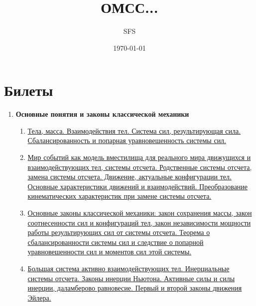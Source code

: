 \documentclass[a4paper,12pt]{article}
\title{ОМСС...}
\author{SFS}
\date{\today}
\begin{document}
\maketitle
\section*{Билеты}
\begin{enumerate}
\item \textbf{ Основные понятия и законы классической механики}

\begin{enumerate}
\item \hyperlink{bil1_1}{Тела, масса. Взаимодействия тел. Система сил, результирующая сила. Сбалансированность и попарная уравновешенность системы сил.}
\item \hyperlink{bil1_2}{Мир событий как модель вместилища для реального мира движущихся и взаимодействующих тел, системы отсчета. Родственные системы отсчета, замена системы отсчета. Движение, актуальные конфигурации тел. Основные характеристики движений и взаимодействий. Преобразование кинематических характеристик при замене системы отсчета.}
\item \hyperlink{bil1_3}{Основные законы классической механики: закон сохранения массы, закон соотнесенности сил и конфигураций тел, закон независимости мощности работы результирующих сил от системы отсчета. Теорема о сбалансированности системы сил и следствие о попарной уравновешенности сил и моментов сил этой системы.}
\item \hyperlink{bil1_4}{Большая система активно взаимодействующих тел. Инерциальные системы отсчета. Законы инерции Ньютона. Активные силы и силы инерции, даламберово равновесие. Первый и второй законы движения Эйлера. }


\end{enumerate}
\end{enumerate}
\end{document}
